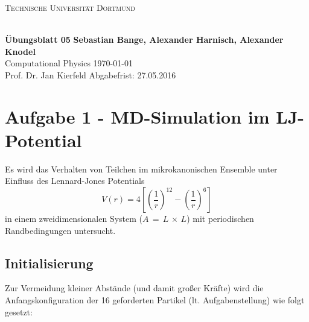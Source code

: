 
\newcommand\OverfullCenter[1]{\noindent\makebox[\linewidth]{#1}}

\noindent
\centerline{\small{\textsc{Technische Universität Dortmund}}} \\
\large\textbf{Übungsblatt 05} \hfill \footnotesize\textbf{Sebastian Bange, Alexander Harnisch, Alexander Knodel} \\
\normalsize Computational Physics \hfill \today \\
Prof. Dr. Jan Kierfeld \hfill Abgabefrist: 27.05.2016\\
\noindent\makebox[\linewidth]{\rule{\textwidth}{0.4pt}}
\section*{Aufgabe 1 - MD-Simulation im LJ-Potential}
Es wird das Verhalten von Teilchen im mikrokanonischen Ensemble unter Einfluss des Lennard-Jones Potentials
\begin{equation}
V(r) = 4 \left[\left(\frac{1}{r}\right)^{12}-\left(\frac{1}{r}\right)^6\right]
\label{eq:lJ}
\end{equation}
in einem zweidimensionalen System ($A\,=\,L\,\times\,L$) mit periodischen Randbedingungen untersucht.

\subsection*{Initialisierung}
Zur Vermeidung kleiner Abstände (und damit großer Kräfte) wird die Anfangskonfiguration der 16 geforderten Partikel (lt. Aufgabenstellung) wie folgt gesetzt:


